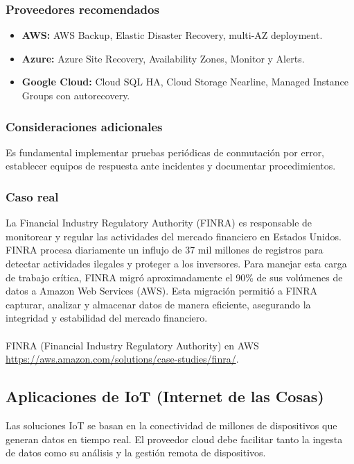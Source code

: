 {            \subsubsection{Proveedores recomendados}
                \begin{itemize}
                    \item \textbf{AWS:} AWS Backup, Elastic Disaster Recovery, multi-AZ deployment.
                    \item \textbf{Azure:} Azure Site Recovery, Availability Zones, Monitor y Alerts.
                    \item \textbf{Google Cloud:} Cloud SQL HA, Cloud Storage Nearline, Managed Instance Groups con autorecovery.
                \end{itemize}
                
            \subsubsection{Consideraciones adicionales}
                Es fundamental implementar pruebas periódicas de conmutación por error, establecer equipos de respuesta ante incidentes y documentar procedimientos.

            \subsubsection{Caso real}
                La Financial Industry Regulatory Authority (FINRA) es responsable de monitorear y regular las actividades del mercado financiero en Estados Unidos. FINRA procesa diariamente un influjo de 37 mil millones de registros para detectar actividades ilegales y proteger a los inversores. Para manejar esta carga de trabajo crítica, FINRA migró aproximadamente el 90\% de sus volúmenes de datos a Amazon Web Services (AWS). Esta migración permitió a FINRA capturar, analizar y almacenar datos de manera eficiente, asegurando la integridad y estabilidad del mercado financiero.

                \paragraph{}FINRA (Financial Industry Regulatory Authority) en AWS \href{https://aws.amazon.com/solutions/case-studies/finra/}{https://aws.amazon.com/solutions/case-studies/finra/}.
                
        \subsection{Aplicaciones de IoT (Internet de las Cosas)}
            Las soluciones IoT se basan en la conectividad de millones de dispositivos que generan datos en tiempo real. El proveedor cloud debe facilitar tanto la ingesta de datos como su análisis y la gestión remota de dispositivos.
                
}
